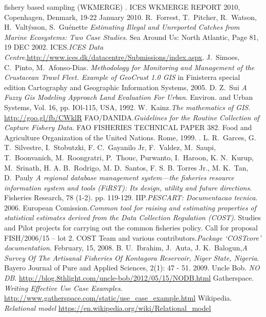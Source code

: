 \documentclass[11pt]{article} %
\begin{document}
\begin{thebibliography}{9}
{fishery based sampling (WKMERGE)
}. ICES WKMERGE REPORT 2010, Copenhagen, Denmark, 19-22 January 2010.
R.\ Forrest, T.\ Pitcher,
R.\ Watson, H.\ Valtýsson,
S.\ Guénette {\em Estimating Illegal and Unreported Catches from Marine Ecosystems: Two Case Studies}. Sea Around Us: North Atlantic, Page 81, 19 DEC 2002.
 ICES.\emph{ICES Data Centre},\url{http://www.ices.dk/datacentre/Submissions/index.aspx}.
J.\ Simoes, C.\ Pinto, M.\ Afonso-Dias. {\em Methodology for Monitoring and  Management of the Crustacean Trawl Fleet. Example of GeoCrust 1.0 GIS} in Finisterra special edition Cartography and Geographic Information Systems, 2005.
D. Z.\ Sui {\em A Fuzzy Gis Modeling Approach Land Evaluation For Urban}. Environ. and Urban Systems, Vol. 16, pp. IOl-115, USA, 1992.
W.\ Kainz.{\em The mathematics of GIS}. \url{http://goo.gl/fb/CWklR}
FAO/DANIDA.{\em Guidelines for the Routine Collection of Capture Fishery Data}. FAO FISHERIES TECHNICAL PAPER 382. Food and Agriculture Organization of the United Nations. Rome, 1999.
.
L. R.\ Garces, G. T.\ Silvestre, I.\ Stobutzki, F. C.\ Gayanilo Jr, F.\ Valdez, M.\ Saupi, T.\ Boonvanich, M.\ Roongratri, P.\ Thouc, Purwanto, I.\ Haroon, K. N.\ Kurup, M.\ Srinath, H. A. B.\ Rodrigo, M. D.\ Santos, F. S. B. Torres Jr., M. K.\ Tan, D.\ Pauly {\em A regional database management system—the fisheries resource information system and tools (FiRST): Its design, utility and future directions}. Fisheries Research, 78 (1-2). pp. 119-129.
IIP.{\em PESCART: Documentacao tecnica}. 2006.
European Comission.{\em Common tool for raising and estimating properties of statistical estimates derived from the Data Collection Regulation (COST)}. Studies and Pilot projects for carrying out the common fisheries policy. Call for proposal FISH/2006/15 – lot 2.
COST Team and various contributors.{\em Package ‘COSTcore’ documentation}. February, 15, 2008.
B. U.\ Ibrahim, J.\ Auta, J. K.\ Balogun,{\em A Survey Of The Artisanal Fisheries Of Kontagora Reservoir, Niger State, Nigeria}. Bayero Journal of Pure and Applied Sciences, 2(1): 47 - 51. 2009.
Uncle Bob. \emph{NO DB}. \url{http://blog.8thlight.com/uncle-bob/2012/05/15/NODB.html}
Gatherspace. \emph{Writing Effective Use Case Examples}. \url{http://www.gatherspace.com/static/use_case_example.html}
Wikipedia. \emph{Relational model} \url{https://en.wikipedia.org/wiki/Relational_model}

\end{thebibliography}
\end{document}

